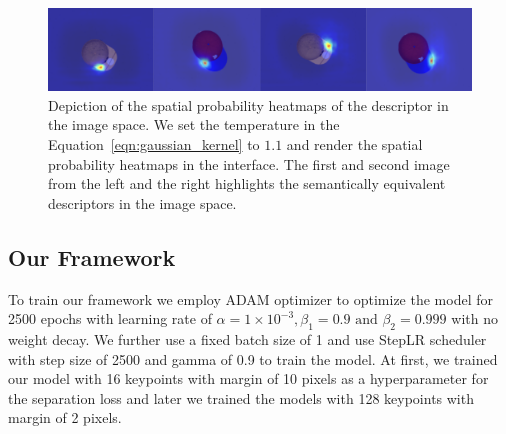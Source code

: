 \begin{figure}[htb]
    \centering
    \includegraphics[scale=0.25]{images/test_don.png}
    \caption{Depiction of the spatial probability heatmaps of the descriptor in the image space. We set the temperature in the Equation~\ref{eqn:gaussian_kernel} to $1.1$
        and render the spatial probability heatmaps in the interface. The first and second image from the left and the right highlights the semantically equivalent descriptors in the image space.}
    \label{fig:check_don}
\end{figure}


\subsection{Our Framework}

To train our framework we employ ADAM optimizer to optimize the model for 2500 epochs with learning rate of
$\alpha = 1 \times 10^{-3}, \beta_1 = 0.9 \text{ and } \beta_2 = 0.999$ with no weight decay. We further use a fixed batch size of 1
and use StepLR scheduler with step size of 2500 and gamma of 0.9 to train the model. At first, we trained our model with 16 keypoints with
margin of 10 pixels as a hyperparameter for the separation loss and later we trained the models with 128 keypoints with margin of 2 pixels.


